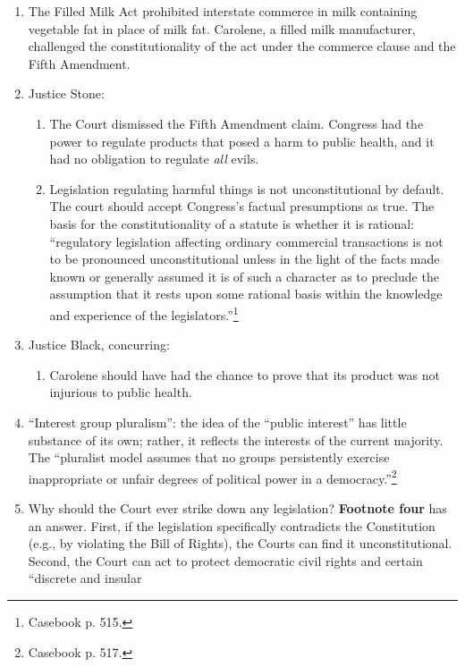 \begin{enumerate}
    \item The Filled Milk Act prohibited interstate commerce in milk 
    containing vegetable fat in place of milk fat. Carolene, a filled milk 
    manufacturer, challenged the constitutionality of the act under the 
    commerce clause and the Fifth Amendment.
    \item Justice Stone:
    \begin{enumerate}
        \item The Court dismissed the Fifth Amendment claim. Congress had the 
        power to regulate products that posed a harm to public health, and it 
        had no obligation to regulate \emph{all} evils.
        \item Legislation regulating harmful things is not unconstitutional by 
        default. The court should accept Congress's factual presumptions 
        as true. The basis for the constitutionality of a statute is whether 
        it is rational: ``regulatory legislation affecting ordinary commercial 
        transactions is not to be pronounced unconstitutional unless in the 
        light of the facts made known or generally assumed it is of such a 
        character as to preclude the assumption that it rests upon some 
        rational basis within the knowledge and experience of the 
        legislators.''\footnote{Casebook p. 515.}
    \end{enumerate}
    \item Justice Black, concurring:
    \begin{enumerate}
        \item Carolene should have had the chance to prove that its product 
        was not injurious to public health. 
    \end{enumerate}
    \item ``Interest group pluralism'': the idea of the ``public interest'' 
    has little substance of its own; rather, it reflects the interests of the 
    current majority. The ``pluralist model assumes that no groups 
    persistently exercise inappropriate or unfair degrees of political power 
    in a democracy.''\footnote{Casebook p. 517.}
    \item Why should the Court ever strike down any legislation? 
    \textbf{Footnote four} has an answer. First, if the legislation 
    specifically contradicts the Constitution (e.g., by violating the Bill of 
    Rights), the Courts can find it unconstitutional. Second, the Court can 
    act to protect democratic civil rights and certain ``discrete and insular 

\end{enumerate}
